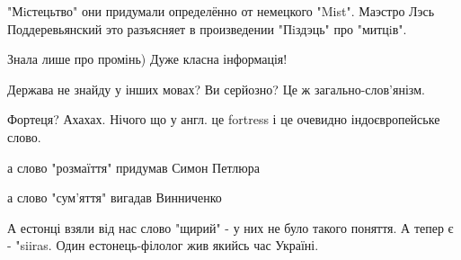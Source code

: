 \begin{itemize}
"Мiстецьтво" они придумали определённо от немецкого "Mist".
Маэстро Лэсь Поддеревьянский это разъясняет в произведении "Пiздэць" про "митцiв".🤩😂😂

 
Знала лише про промінь) Дуже класна інформація!

 
Держава не знайду у інших мовах? Ви серйозно? Це ж загально-слов'янізм.

\begin{itemize}
 
Фортеця? Ахахах. Нічого що у англ. це fortress і це очевидно індоєвропейське слово. \Smiley[1.0][yellow]

 
а слово "розмаїття" придумав Симон Петлюра

а слово "сум'яття" вигадав Винниченко
\end{itemize}


А естонці взяли від нас слово "щирий" - у них не було такого поняття. А тепер є
- "siiras. Один естонець-філолог жив якийсь час Україні.

\begin{itemize}
 

\end{itemize}
\end{itemize}
